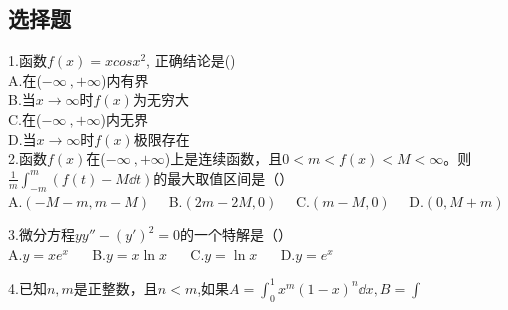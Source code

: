 

\subsection{选择题}
1.函数$f(x)=xcosx^2$, 正确结论是()\\
A.在($-\infty~,+\infty$)内有界\\
B.当$x\to\infty$时$f(x)$为无穷大\\
C.在($-\infty~,+\infty$)内无界\\
D.当$x\to\infty$时$f(x)$极限存在\\

2.函数$f(x)$在($-\infty~,+\infty$)上是连续函数，且$0<m<f(x)<M<\infty$。则
$ \frac{1}{m} \int_{-m}^{m}(f(t)-M \dd{t})$的最大取值区间是（）\\
A.$(-M-m,m-M) \quad$ B.$ (2m-2M,0)\quad$  C.$(m-M,0)\quad$  D.$(0,M+m)$

3.微分方程$y y''-(y')^2=0$的一个特解是（）\\
A.$y=xe^x$ $\quad$ B.$y=x\ln x$ $\quad$ C.$y=\ln x$  $\quad$ D.$y=e^x$

4.已知$n,m$是正整数，且$n<m$,如果$A=\int_{0}^{1} x^m(1-x)^n \dd{x},B=\int_{}$
